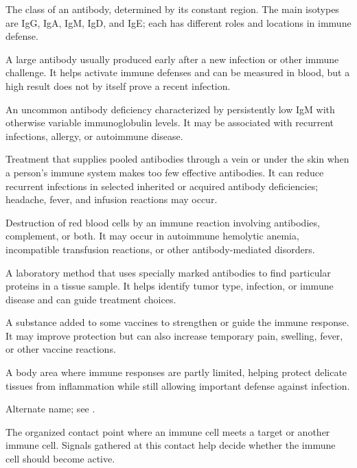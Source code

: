  The class of an antibody, determined by its constant region. The main isotypes are IgG, IgA, IgM, IgD, and IgE; each has different roles and locations in immune defense.

 A large antibody usually produced early after a new infection or other immune challenge. It helps activate immune defenses and can be measured in blood, but a high result does not by itself prove a recent infection.

 An uncommon antibody deficiency characterized by persistently low IgM with otherwise variable immunoglobulin levels. It may be associated with recurrent infections, allergy, or autoimmune disease.

 Treatment that supplies pooled antibodies through a vein or under the skin when a person's immune system makes too few effective antibodies. It can reduce recurrent infections in selected inherited or acquired antibody deficiencies; headache, fever, and infusion reactions may occur.

 Destruction of red blood cells by an immune reaction involving antibodies, complement, or both. It may occur in autoimmune hemolytic anemia, incompatible transfusion reactions, or other antibody-mediated disorders.

 A laboratory method that uses specially marked antibodies to find particular proteins in a tissue sample. It helps identify tumor type, infection, or immune disease and can guide treatment choices.

 A substance added to some vaccines to strengthen or guide the immune response. It may improve protection but can also increase temporary pain, swelling, fever, or other vaccine reactions.

 A body area where immune responses are partly limited, helping protect delicate tissues from inflammation while still allowing important defense against infection.

 Alternate name; see .

 The organized contact point where an immune cell meets a target or another immune cell. Signals gathered at this contact help decide whether the immune cell should become active.

